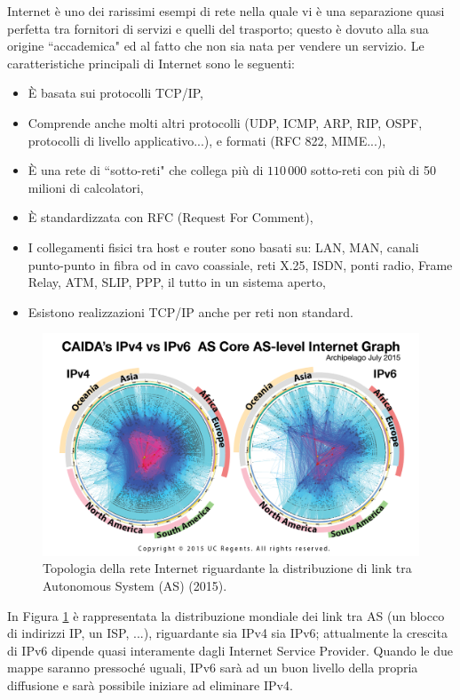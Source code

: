 Internet è uno dei rarissimi esempi di rete nella quale vi è una separazione quasi perfetta tra fornitori di servizi e quelli del trasporto; questo è dovuto alla sua origine \textquotedblleft accademica" ed al fatto che non sia nata per vendere un servizio. Le caratteristiche principali di Internet sono le seguenti:
\begin{itemize}
	\item È basata sui protocolli TCP/IP,
	\item Comprende anche molti altri protocolli (UDP, ICMP, ARP, RIP, OSPF, protocolli di livello applicativo...), e formati (RFC 822, MIME...),
	\item È una rete di \textquotedblleft sotto-reti" che collega più di $110\,000$ sotto-reti con più di 50 milioni di calcolatori,
	\item È standardizzata con RFC (Request For Comment),
	\item I collegamenti fisici tra host e router sono basati su: LAN, MAN, canali punto-punto in fibra od in cavo coassiale, reti X.25, ISDN, ponti radio, Frame Relay, ATM, SLIP, PPP, il tutto in un sistema aperto,
	\item Esistono realizzazioni TCP/IP anche per reti non standard.
\end{itemize}
\begin{figure}[htbp]
	\centering
	\includegraphics[scale = 0.3]{images/ascore-2015}
	\caption{Topologia della rete Internet riguardante la distribuzione di link tra Autonomous System (AS) (2015).}
	\label{img:ascore-2015}
\end{figure}
In Figura \ref{img:ascore-2015} è rappresentata la distribuzione mondiale dei link tra AS (un blocco di indirizzi IP, un ISP, ...), riguardante sia IPv4 sia IPv6; attualmente la crescita di IPv6 dipende quasi interamente dagli Internet Service Provider. Quando le due mappe saranno pressoché uguali, IPv6 sarà ad un buon livello della propria diffusione e sarà possibile iniziare ad eliminare IPv4.\\

